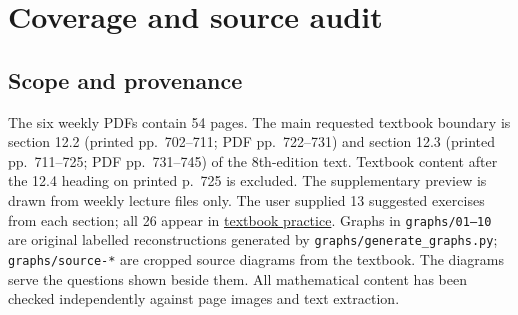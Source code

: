 \section{Coverage and source audit}\label{audit}
\subsection{Scope and provenance}
The six weekly PDFs contain 54 pages. The main requested textbook boundary is section 12.2 (printed pp.~702--711; PDF pp.~722--731) and section 12.3 (printed pp.~711--725; PDF pp.~731--745) of the 8th-edition text. Textbook content after the 12.4 heading on printed p.~725 is excluded. The supplementary preview is drawn from weekly lecture files only. The user supplied 13 suggested exercises from each section; all 26 appear in \hyperref[textbook]{textbook practice}. Graphs in \texttt{graphs/01--10} are original labelled reconstructions generated by \texttt{graphs/generate\_graphs.py}; \texttt{graphs/source-*} are cropped source diagrams from the textbook. The diagrams serve the questions shown beside them. All mathematical content has been checked independently against page images and text extraction.

